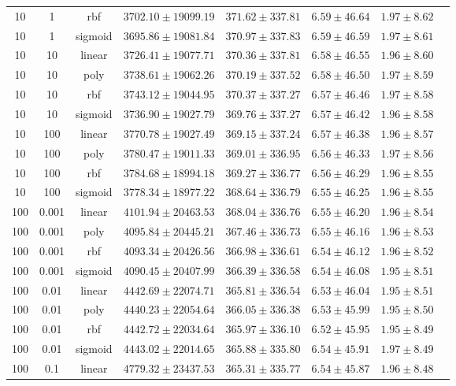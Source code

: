 \begin{tabular}{cccrrrrr}
10 & 1 & rbf & $3702.10 \pm 19099.19$ & $371.62 \pm 337.81$ & $6.59 \pm 46.64$ & $1.97 \pm 8.62$\\
10 & 1 & sigmoid & $3695.86 \pm 19081.84$ & $370.97 \pm 337.83$ & $6.59 \pm 46.59$ & $1.97 \pm 8.61$\\
10 & 10 & linear & $3726.41 \pm 19077.71$ & $370.36 \pm 337.81$ & $6.58 \pm 46.55$ & $1.96 \pm 8.60$\\
10 & 10 & poly & $3738.61 \pm 19062.26$ & $370.19 \pm 337.52$ & $6.58 \pm 46.50$ & $1.97 \pm 8.59$\\
10 & 10 & rbf & $3743.12 \pm 19044.95$ & $370.37 \pm 337.27$ & $6.57 \pm 46.46$ & $1.97 \pm 8.58$\\
10 & 10 & sigmoid & $3736.90 \pm 19027.79$ & $369.76 \pm 337.27$ & $6.57 \pm 46.42$ & $1.96 \pm 8.58$\\
10 & 100 & linear & $3770.78 \pm 19027.49$ & $369.15 \pm 337.24$ & $6.57 \pm 46.38$ & $1.96 \pm 8.57$\\
10 & 100 & poly & $3780.47 \pm 19011.33$ & $369.01 \pm 336.95$ & $6.56 \pm 46.33$ & $1.97 \pm 8.56$\\
10 & 100 & rbf & $3784.68 \pm 18994.18$ & $369.27 \pm 336.77$ & $6.56 \pm 46.29$ & $1.96 \pm 8.55$\\
10 & 100 & sigmoid & $3778.34 \pm 18977.22$ & $368.64 \pm 336.79$ & $6.55 \pm 46.25$ & $1.96 \pm 8.55$\\
100 & 0.001 & linear & $4101.94 \pm 20463.53$ & $368.04 \pm 336.76$ & $6.55 \pm 46.20$ & $1.96 \pm 8.54$\\
100 & 0.001 & poly & $4095.84 \pm 20445.21$ & $367.46 \pm 336.73$ & $6.55 \pm 46.16$ & $1.96 \pm 8.53$\\
100 & 0.001 & rbf & $4093.34 \pm 20426.56$ & $366.98 \pm 336.61$ & $6.54 \pm 46.12$ & $1.96 \pm 8.52$\\
100 & 0.001 & sigmoid & $4090.45 \pm 20407.99$ & $366.39 \pm 336.58$ & $6.54 \pm 46.08$ & $1.95 \pm 8.51$\\
100 & 0.01 & linear & $4442.69 \pm 22074.71$ & $365.81 \pm 336.54$ & $6.53 \pm 46.04$ & $1.95 \pm 8.51$\\
100 & 0.01 & poly & $4440.23 \pm 22054.64$ & $366.05 \pm 336.38$ & $6.53 \pm 45.99$ & $1.95 \pm 8.50$\\
100 & 0.01 & rbf & $4442.72 \pm 22034.64$ & $365.97 \pm 336.10$ & $6.52 \pm 45.95$ & $1.95 \pm 8.49$\\
100 & 0.01 & sigmoid & $4443.02 \pm 22014.65$ & $365.88 \pm 335.80$ & $6.54 \pm 45.91$ & $1.97 \pm 8.49$\\
100 & 0.1 & linear & $4779.32 \pm 23437.53$ & $365.31 \pm 335.77$ & $6.54 \pm 45.87$ & $1.96 \pm 8.48$\\

\end{tabular}
